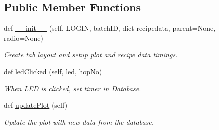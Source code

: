 \subsection*{Public Member Functions}
\begin{DoxyCompactItemize}
\item 
\mbox{\label{classboil_mash_monitor_1_1_tab_boil_aa429f465e3c23ea2d04a4e4eef708b04}} 
def \mbox{\hyperlink{classboil_mash_monitor_1_1_tab_boil_aa429f465e3c23ea2d04a4e4eef708b04}{\+\_\+\+\_\+init\+\_\+\+\_\+}} (self, L\+O\+G\+IN, batch\+ID, dict recipedata, parent=None, radio=None)
\begin{DoxyCompactList}\small\item\em Create tab layout and setup plot and recipe data timings. \end{DoxyCompactList}\item 
\mbox{\label{classboil_mash_monitor_1_1_tab_boil_a110ad7d974482e1d177b73dcd3cf6b0d}} 
def \mbox{\hyperlink{classboil_mash_monitor_1_1_tab_boil_a110ad7d974482e1d177b73dcd3cf6b0d}{led\+Clicked}} (self, led, hop\+No)
\begin{DoxyCompactList}\small\item\em When L\+ED is clicked, set timer in Database. \end{DoxyCompactList}\item 
\mbox{\label{classboil_mash_monitor_1_1_tab_boil_aa086a652503c3f4cb0d7e601444506ba}} 
def \mbox{\hyperlink{classboil_mash_monitor_1_1_tab_boil_aa086a652503c3f4cb0d7e601444506ba}{update\+Plot}} (self)
\begin{DoxyCompactList}\small\item\em Update the plot with new data from the database. \end{DoxyCompactList}\end{DoxyCompactItemize}
